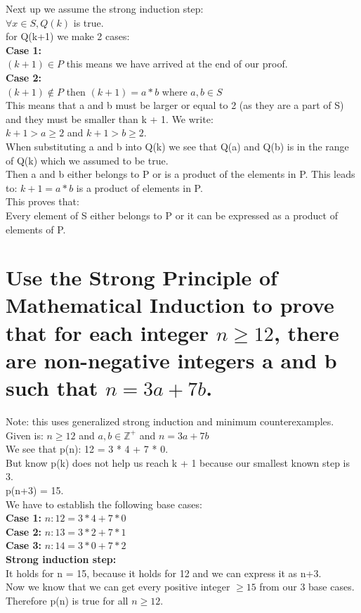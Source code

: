 Next up we assume the strong induction step:\\
$\forall x \in S, Q(k)$ is true.\\
for Q(k+1) we make 2 cases:\\
\textbf{Case 1:}\\
$(k + 1)\in P$ this means we have arrived at the end of our proof.\\
\textbf{Case 2:}\\
$(k+1)\notin P$ then $(k + 1)=a * b$ where $a,b\in S$\\
This means that a and b must be larger or equal to 2 (as they are a part of S) and they must be smaller than k + 1. We write:\\
$k+1>a\geq 2$ and $k+1>b\geq 2$.\\
When substituting a and b into Q(k) we see that Q(a) and Q(b) is in the range of Q(k) which we assumed to be true.\\
Then a and b either belongs to P or is a product of the elements in P. This leads to:
$k + 1 = a * b$ is a product of elements in P.\\
This proves that:\\
Every element of S either belongs to P or it can  be expressed as a product of elements of P.{\Huge\Bat}



\section{Use the Strong Principle of Mathematical Induction to prove that for each integer $n\geq 12$, there are non-negative integers a and b such that $n = 3a + 7b$.} 
Note: this uses generalized strong induction and minimum counterexamples.
Given is: $n\geq 12$ and $a,b\in \mathbb{Z}^{+}$ and $n=3a+7b$\\
We see that p(n): 12 = 3 * 4 + 7 * 0.\\
But know p(k) does not help us reach k + 1 because our smallest known step is 3.\\
p(n+3) = 15.\\
We have to establish the following base cases:\\
\textbf{Case 1: }
$n : 12 = 3 * 4 + 7 * 0$\\
\textbf{Case 2: }
$n : 13 = 3 * 2 + 7 * 1$\\
\textbf{Case 3: }
$n : 14 = 3 * 0 + 7 * 2$\\

\textbf{Strong induction step:}\\
It holds for n = 15, because it holds for 12 and we can express it as n+3.\\
Now we know that we can get every positive integer $\geq 15$ from our 3 base cases.\\
Therefore p(n) is true for all $n\geq 12$.{\Huge\Bat}
 
